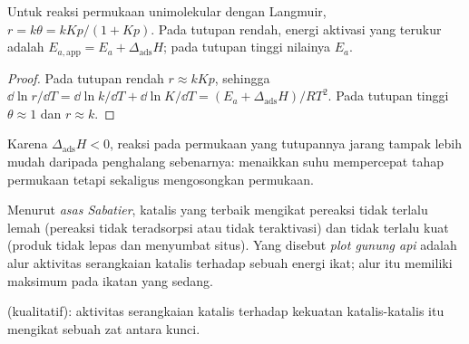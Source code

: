 \begin{proposition}\label{prop:b3:surfaces-catalysis:apparent-ea}
Untuk reaksi permukaan unimolekular dengan  Langmuir, $r = k\theta = kKp/(1 + Kp)$.
Pada tutupan rendah, energi aktivasi yang terukur adalah $E_{a,\mathrm{app}} = E_a + \Delta_{\mathrm{ads}}H$; pada
tutupan tinggi nilainya $E_a$.
\end{proposition}

\begin{proof}
Pada tutupan rendah $r \approx kKp$, sehingga $\dd\ln r/\dd T = \dd\ln k/\dd T + \dd\ln K/\dd T = (E_a + \Delta_{\mathrm{ads}}H)/RT^2$.
Pada tutupan tinggi $\theta \approx 1$ dan $r \approx k$.
\end{proof}

Karena $\Delta_{\mathrm{ads}}H < 0$, reaksi pada permukaan yang tutupannya jarang tampak lebih
mudah daripada penghalang sebenarnya: menaikkan suhu mempercepat tahap
permukaan tetapi sekaligus mengosongkan permukaan.

\begin{definition}\label{def:b3:surfaces-catalysis:sabatier}
Menurut \emph{asas Sabatier}, katalis yang terbaik mengikat
pereaksi tidak terlalu lemah (pereaksi tidak teradsorpsi atau tidak teraktivasi)
dan tidak terlalu kuat (produk tidak lepas dan menyumbat situs). Yang disebut
\emph{plot gunung api} adalah alur aktivitas serangkaian
katalis terhadap sebuah energi ikat; alur itu memiliki maksimum pada ikatan
yang sedang.
\end{definition}

\begin{omfigure}

{\small {} (kualitatif): aktivitas serangkaian katalis terhadap
kekuatan katalis-katalis itu mengikat sebuah zat antara kunci.}
\end{omfigure}

